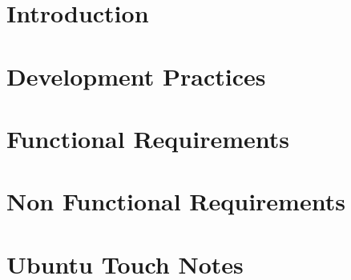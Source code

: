 



\chapter{Introduction}







\chapter{Development Practices}






\chapter{Functional Requirements}






\newpage


\chapter{Non Functional Requirements}





\chapter{Ubuntu Touch Notes}









%




